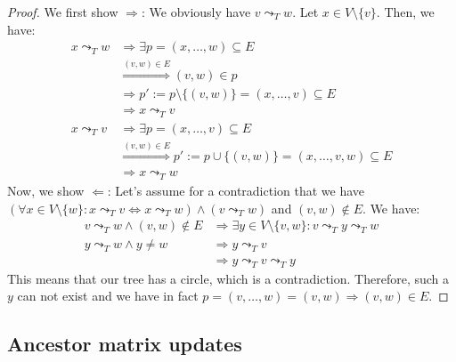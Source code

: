 \begin{proof}
    We first show $\Rightarrow$: We obviously have $v \leadsto_T w$. Let $x \in V \setminus \{v\}$. Then, we have:
    \begin{align*}
        x \leadsto_T w  &\Rightarrow \exists p = (x, \dots, w) \subseteq E \\
                        &\stackrel{(v, w) \in E}{\Rightarrow} (v, w) \in p \\
                        &\Rightarrow p' := p \setminus \{(v, w)\} = (x, \dots, v) \subseteq E \\
                        &\Rightarrow x \leadsto_T v \\
        x \leadsto_T v  &\Rightarrow \exists p = (x, \dots, v) \subseteq E \\
                        &\stackrel{(v, w) \in E}{\Rightarrow} p' := p \cup \{(v, w)\} = (x, \dots, v, w) \subseteq E \\
                        &\Rightarrow x \leadsto_T w
    \end{align*}
    Now, we show $\Leftarrow$: Let's assume for a contradiction that we have $(\forall x \in V \setminus \{w\}: x \leadsto_T v \Leftrightarrow x \leadsto_T w) \wedge (v \leadsto_T w)$ and $(v, w) \notin E$. We have:
    \begin{align*}
        v \leadsto_T w \wedge (v, w) \notin E &\Rightarrow \exists y \in V \setminus \{v, w\}: v \leadsto_T y \leadsto_T w \\
        y \leadsto_T w \wedge y \neq w &\Rightarrow y \leadsto_T v \\
        &\Rightarrow y \leadsto_T v \leadsto_T y
    \end{align*}
    This means that our tree has a circle, which is a contradiction. Therefore, such a $y$ can not exist and we have in fact $p = (v, \dots, w) = (v, w) \Rightarrow (v, w) \in E$.
\end{proof}

\subsection{Ancestor matrix updates}


